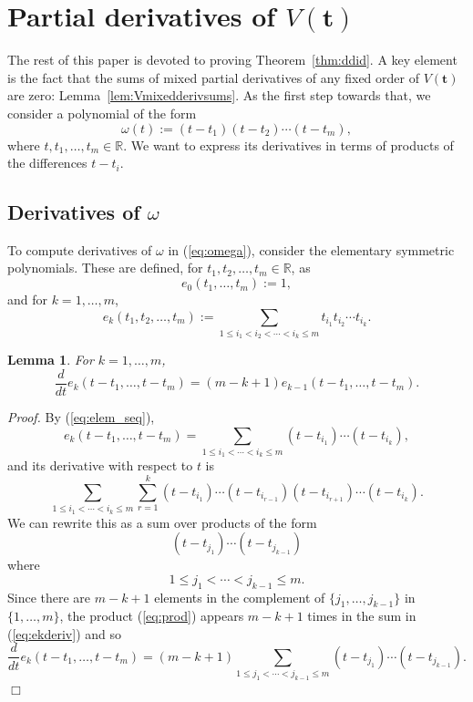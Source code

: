 \documentclass[12pt]{article}
\newcommand{\RR}{\mathbb{R}}
\def\bft{\mathbf{t}}
\newtheorem{lemma}{Lemma}
\newenvironment{proof}{\begin{trivlist}\item[]{\emph{Proof.}}}
               {\hfill$\Box$\end{trivlist}}
\begin{document}
\section{Partial derivatives of $V(\bft)$}
The rest of this paper is devoted to proving Theorem~\ref{thm:ddid}.
A key element is the fact that the sums of mixed partial derivatives
of any fixed order of $V(\bft)$ are zero:
Lemma~\ref{lem:Vmixedderivsums}.
As the first step towards that,
we consider a polynomial of the form
\begin{equation}\label{eq:omega}
 \omega(t) := (t-t_1) (t-t_2) \cdots (t-t_m),
\end{equation}
where $t,t_1,\ldots,t_m \in \RR$.
We want to express its derivatives in terms of products of
the differences $t-t_i$.

\subsection{Derivatives of $\omega$}
To compute derivatives of $\omega$ in (\ref{eq:omega}),
consider the elementary symmetric polynomials.
These are defined, for $t_1,t_2,\ldots,t_m \in \RR$, as
$$ e_0(t_1,\ldots,t_m) := 1, $$
and for $k=1,\ldots,m$,
\begin{equation}\label{eq:elem_seq}
 e_k(t_1,t_2,\ldots,t_m) :=
  \sum_{1 \le i_1 < i_2 < \cdots < i_k \le m} t_{i_1} t_{i_2} \cdots t_{i_k}.
\end{equation}

\begin{lemma}\label{lem:ederivs}
For $k=1,\ldots,m$,
$$
 \frac{d}{dt} e_k(t-t_1,\ldots,t-t_m) =
   (m-k+1) e_{k-1}(t-t_1,\ldots,t-t_m).
$$
\end{lemma}

\begin{proof}
By (\ref{eq:elem_seq}),
$$
e_k(t-t_1,\ldots,t-t_m) =
  \sum_{1 \le i_1 < \cdots < i_k \le m}
	(t-t_{i_1}) \cdots (t-t_{i_k}),
$$
and its derivative with respect to $t$ is
\begin{equation}\label{eq:ekderiv}
  \sum_{1 \le i_1 < \cdots < i_k \le m}
\sum_{r=1}^k
(t-t_{i_1})\cdots(t-t_{i_{r-1}})
(t-t_{i_{r+1}})\cdots(t-t_{i_k}).
\end{equation}
We can rewrite this as a sum over
products of the form
\begin{equation}\label{eq:prod}
(t-t_{j_1})\cdots(t-t_{j_{k-1}})
\end{equation}
where
$$ 1 \le j_1 < \cdots < j_{k-1} \le m. $$
Since there are $m-k+1$ elements in the complement
of $\{j_1,\ldots,j_{k-1}\}$ in $\{1,\ldots,m\}$,
the product (\ref{eq:prod}) appears $m-k+1$
times in the sum in (\ref{eq:ekderiv}) and so
$$
 \frac{d}{dt} e_k(t-t_1,\ldots,t-t_m) =
(m-k+1) \sum_{1 \le j_1 < \cdots < j_{k-1} \le m}
	(t-t_{j_1})\cdots(t-t_{j_{k-1}}).
$$
\end{proof}
\end{document}
